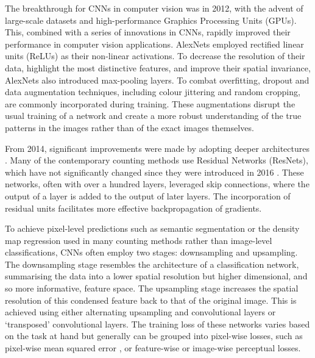 \documentclass[../thesis.tex]{subfiles}
\begin{document}
The breakthrough for CNNs in computer vision was in 2012, with the advent of large-scale datasets and high-performance Graphics Processing Units (GPUs).
This, combined with a series of innovations in CNNs, rapidly improved their performance in computer vision applications.
AlexNets \cite{krizhevsky2012imagenet} employed rectified linear units (ReLUs) as their non-linear activations.
To decrease the resolution of their data, highlight the most distinctive features, and improve their spatial invariance, AlexNets also introduced max-pooling layers.
To combat overfitting, dropout \cite{srivastava2014dropout} and data augmentation techniques, including colour jittering and random cropping, are commonly incorporated during training. These augmentations disrupt the usual training of a network and create a more robust understanding of the true patterns in the images rather than of the exact images themselves. 

From 2014, significant improvements were made by adopting deeper architectures \cite{szegedy2015going,simonyan2014very}.
Many of the contemporary counting methods use Residual Networks (ResNets), which have not significantly changed since they were introduced in 2016 \cite{he2016resnet}.
These networks, often with over a hundred layers, leveraged skip connections, where the output of a layer is added to the output of later layers.
The incorporation of residual units facilitates more effective backpropagation of gradients. 

To achieve pixel-level predictions such as semantic segmentation \cite{He2017, Brabandere2017} or the density map regression used in many counting methods \cite{ranjan2021Famnet, shi2022represent, liu2022countr} rather than image-level classifications, CNNs often employ two stages: downsampling and upsampling.
The downsampling stage resembles the architecture of a classification network, summarising the data into a lower spatial resolution but higher dimensional, and so more informative, feature space.
The upsampling stage increases the spatial resolution of this condensed feature back to that of the original image.
This is achieved using either alternating upsampling and convolutional layers or `transposed' convolutional layers.
The training loss of these networks varies based on the task at hand but generally can be grouped into pixel-wise losses, such as pixel-wise mean squared error \cite{ranjan2021Famnet, shi2022represent}, or feature-wise \cite{johnson2016perceptual} or image-wise \cite{Goodfellow2014} perceptual losses.
\end{document}
